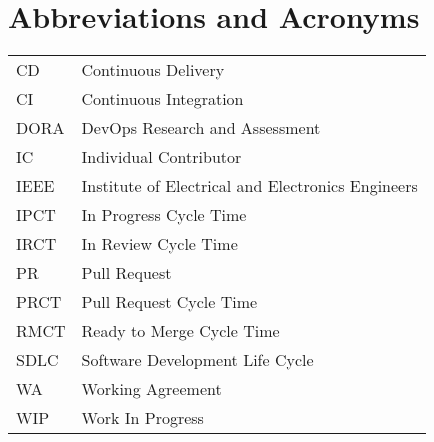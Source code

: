 \chapter*{Abbreviations and Acronyms}

\noindent
\begin{longtable}{@{}p{}p{}@{}}
CD & Continuous Delivery \\
CI & Continuous Integration \\
DORA & DevOps Research and Assessment \\
IC & Individual Contributor \\
IEEE & Institute of Electrical and Electronics Engineers \\
IPCT & In Progress Cycle Time \\
IRCT & In Review Cycle Time \\
PR & Pull Request \\
PRCT & Pull Request Cycle Time \\
RMCT & Ready to Merge Cycle Time \\
SDLC & Software Development Life Cycle \\
WA & Working Agreement \\
WIP & Work In Progress \\
\end{longtable}